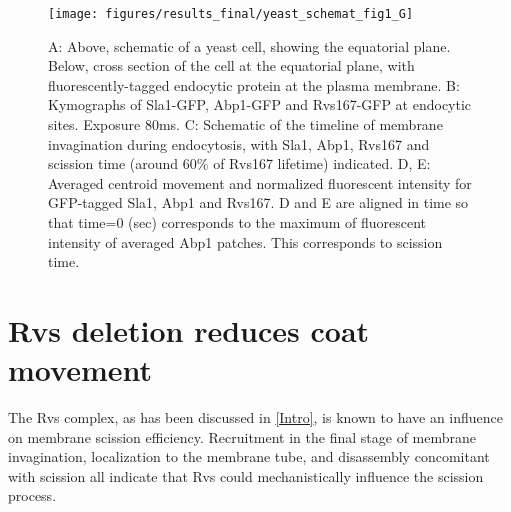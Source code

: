 	\begin{figure}[H]
	\centering
	\hspace*{-1.8cm}%
	\texttt{[image: figures/results\_final/yeast\_schemat\_fig1\_G]}
	\caption[Tracking yeast endocytic proteins]
	{A: Above, schematic of a yeast cell, showing the equatorial plane. Below, cross section of the cell at the equatorial plane, with fluorescently-tagged endocytic protein at the plasma membrane. 
B: Kymographs of Sla1-GFP, Abp1-GFP and Rvs167-GFP at endocytic sites. Exposure 80ms.
C: Schematic of the timeline of membrane invagination during endocytosis, with Sla1, Abp1, Rvs167 and scission time (around 60\% of Rvs167 lifetime) indicated. 
D, E: Averaged centroid movement and normalized fluorescent intensity for GFP-tagged Sla1, Abp1 and Rvs167. D and E are aligned in time so that time=0 (sec) corresponds to the maximum of fluorescent intensity of averaged Abp1 patches. This corresponds to scission time.
	\label{fig1_schematic}}
	\end{figure}





\section{Rvs deletion reduces coat movement}
\label{sec:rvsdel}
The Rvs complex, as has been discussed in \ref{Intro}, is known to have an influence on membrane scission efficiency. Recruitment in the final stage of membrane invagination, localization to the membrane tube, and disassembly concomitant with scission all indicate that Rvs could mechanistically influence the scission process.


	\vspace{1mm}
	
